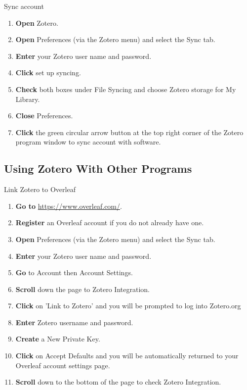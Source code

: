 \documentclass[10pt,a4paper]{article}
\begin{document}
\begin{textbox}{Sync account}
 

  

\begin{enumerate}
\item \textbf{Open} Zotero.
\item \textbf{Open} Preferences (via the Zotero menu) and select the Sync tab.
\item \textbf {Enter} your Zotero user name and password.
\item \textbf {Click} set up syncing.
\item \textbf {Check} both boxes under File Syncing and choose Zotero storage for My Library.
\item \textbf {Close} Preferences.
\item \textbf {Click} the green circular arrow button at the top right corner of the Zotero program window to sync account with software.
\end{enumerate}

\end{textbox}

\subsection{Using Zotero With Other Programs}

\begin{textbox}{Link Zotero to Overleaf}
 

  

\begin{enumerate}
\item \textbf{Go to}  \href{https://www.overleaf.com/}{https://www.overleaf.com/}. 
\item \textbf{Register} an Overleaf account if you do not already have one.
\item \textbf{Open} Preferences (via the Zotero menu) and select the Sync tab.
\item \textbf {Enter} your Zotero user name and password.
\item \textbf {Go} to Account then Account Settings.
\item \textbf {Scroll} down the page to Zotero Integration.
\item \textbf {Click} on 'Link to Zotero' and you will be prompted to log into Zotero.org
\item \textbf {Enter} Zotero username and password.
\item \textbf {Create} a New Private Key.
\item \textbf {Click} on Accept Defaults and you will be automatically returned to your Overleaf account settings page.
\item \textbf {Scroll} down to the bottom of the page to check Zotero Integration.
\end{enumerate}

\end{textbox}
\end{document}
